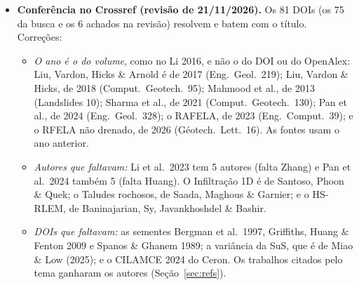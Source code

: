 \documentclass[11pt,a4paper]{article}
\begin{document}
\begin{itemize}
    DOI).
  \item \textbf{Conferência no Crossref (revisão de 21/11/2026).} Os 81 DOIs (os 75 da busca e os 6 achados na
    revisão) resolvem e batem com o título. Correções:
    \begin{itemize}
      \item \emph{O ano é o do volume}, como no Li 2016, e não o do DOI ou do OpenAlex: Liu, Vardon, Hicks \& Arnold é
        de 2017 (Eng.\ Geol.\ 219); Liu, Vardon \& Hicks, de 2018 (Comput.\ Geotech.\ 95); Mahmood et al., de 2013
        (Landslides 10); Sharma et al., de 2021 (Comput.\ Geotech.\ 130); Pan et al., de 2024 (Eng.\ Geol.\ 328); o
        RAFELA, de 2023 (Eng.\ Comput.\ 39); e o RFELA não drenado, de 2026 (Géotech.\ Lett.\ 16). As fontes usam o ano
        anterior.
      \item \emph{Autores que faltavam:} Li et al.\ 2023 tem 5 autores (falta Zhang) e Pan et al.\ 2024 também 5
        (falta Huang). O Infiltração 1D é de Santoso, Phoon \& Quek; o Taludes rochosos, de Saada, Maghous \& Garnier;
        e o HS-RLEM, de Baninajarian, Sy, Javankhoshdel \& Bashir.
      \item \emph{DOIs que faltavam:} as sementes Bergman et al.\ 1997, Griffiths, Huang \& Fenton 2009 e Spanos \&
        Ghanem 1989; a variância da SuS, que é de Miao \& Low (2025); e o CILAMCE 2024 do Ceron. Os trabalhos citados
        pelo tema ganharam os autores (Seção~\ref{sec:refs}).
    \end{itemize}
\end{itemize}

\end{document}
